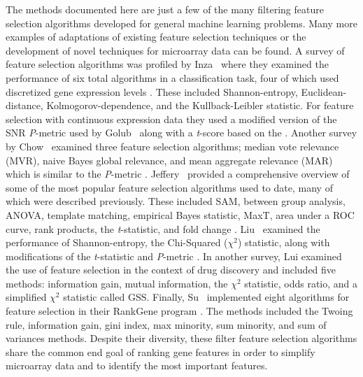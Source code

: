 The methods documented here are just a few of the many filtering feature
selection algorithms developed for general machine learning problems.  Many
more examples of adaptations of existing feature selection techniques or the
development of novel techniques for microarray data can be found.  A survey of
feature selection algorithms was profiled by Inza \ea\ where they examined the
performance of six total algorithms in a classification task, four of which
used discretized gene expression levels \cite{PMID_15219288}. These included
Shannon-entropy, Euclidean-distance, Kolmogorov-dependence, and the
Kullback-Leibler statistic.  For feature selection with continuous expression
data they used a modified version of the SNR \emph{P}-metric used by Golub \ea\
along with a \emph{t}-score based on the \ttest. Another survey by Chow \ea\
examined three feature selection algorithms; median vote relevance (MVR), naive
Bayes global relevance, and mean aggregate relevance (MAR) which is similar to
the \emph{P}-metric \cite{PMID_11242594}.  Jeffery \ea\ provided a
comprehensive overview of some of the most popular feature selection algorithms
used to date, many of which were described previously.  These included SAM,
between group analysis, ANOVA, template matching, empirical Bayes statistic,
MaxT, area under a ROC curve, rank products, the \emph{t}-statistic, and fold
change \cite{PMID_154652968}.  Liu \ea\ examined the performance of
Shannon-entropy, the Chi-Squared (${\chi}^{2}$) statistic, along with
modifications of the \emph{t}-statistic and \emph{P}-metric
\cite{PMID_14571374}.  In another survey, Lui examined the use of feature
selection in the context of drug discovery and included five methods:
information gain, mutual information, the ${\chi}^{2}$ statistic, odds ratio,
and a simplified ${\chi}^{2}$ statistic called GSS.  Finally, Su \ea\
implemented eight algorithms for feature selection in their RankGene program
\cite{PMID_146536352}.   The methods included the Twoing rule, information
gain, gini index, max minority, sum minority, and sum of variances methods.
Despite their diversity, these filter feature selection algorithms share the 
common end goal of ranking gene features in order to simplify microarray data and to 
identify the most important features.



